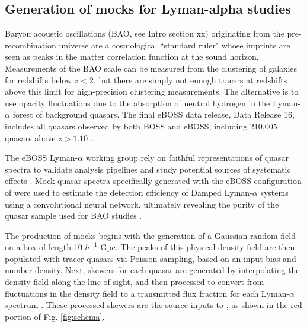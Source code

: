\subsection{Generation of mocks for Lyman-alpha studies}


Baryon acoustic oscillations (BAO, see Intro section xx) originating from the pre-recombination universe are a cosmological ``standard ruler" whose imprints are seen as peaks in the matter correlation function at the sound horizon. Measurements of the BAO scale can be measured from the clustering of galaxies for redshifts below $z<2$, but there are simply not enough tracers at redshifts above this limit for high-precision clustering measurements. The alternative is to use opacity fluctuations due to the absorption of neutral hydrogen in the Lyman-$\alpha$ forest of background quasars. The final eBOSS data release, Data Release 16, includes all quasars observed by both BOSS and eBOSS, including 210,005 quasars above $z>1.10$ \cite{du_Mas_des_Bourboux_2020}.

The eBOSS Lyman-$\alpha$ working group rely on faithful representations of quasar spectra to validate analysis pipelines and study potential sources of systematic effects \cite{Farr_2020}. Mock quasar spectra specifically generated with the eBOSS configuration of  were used to estimate the detection efficiency of Damped Lyman-$\alpha$ systems using a convolutional neural network, ultimately revealing the purity of the quasar sample used for BAO studies \cite{Chabanier_21}. 

The production of mocks begins with the generation of a Gaussian random field on a box of length 10 $h^{-1}$ Gpc. The peaks of this physical density field are then populated with tracer quasars via Poisson sampling, based on an input bias and number density. Next, skewers for each quasar are generated by interpolating the density field along the line-of-sight, and then processed to convert from fluctuations in the density field to a transmitted flux fraction for each Lyman-$\alpha$ spectrum \cite{du_Mas_des_Bourboux_2020}. These processed skewers are the source inputs to , as shown in the red portion of Fig. \ref{fig:schema}.


